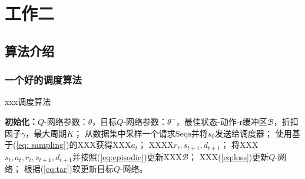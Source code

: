 \chapter{工作二}

\section{算法介绍}






\subsection{一个好的调度算法}
\begin{algorithm}[htb!]
\caption{xxx调度算法}
\label{alg:schem}
\begin{algorithmic}[1]
\STATE \textbf{初始化：}$Q$-网络参数：$\theta$，目标$Q$-网络参数：$\theta^{-}$，最佳状态-动作-r缓冲区$\mathcal{B}$，折扣因子$\gamma$，最大周期$K$；
\STATE 从数据集中采样一个请求$\text{Seqs}$并将$s_0$发送给调度器；
        \STATE 使用基于(\ref{eq: sampling})的XXX获得XXX$a_t$；
        \STATE XXXX$r_t, s_{t+1}, d_{t+1}$；
        \STATE 将XXX$s_t, a_t, r_t, s_{t+1},  d_{t+1}$并按照(\ref{eq:episodic})更新XXX$\mathcal{B}$；
        \STATE XXX(\ref{eq:loss})更新$Q$-网络；
        \STATE 根据(\ref{eq:tar})软更新目标$Q$-网络。
    \ENDFOR
\ENDFOR
\end{algorithmic}
\end{algorithm}

